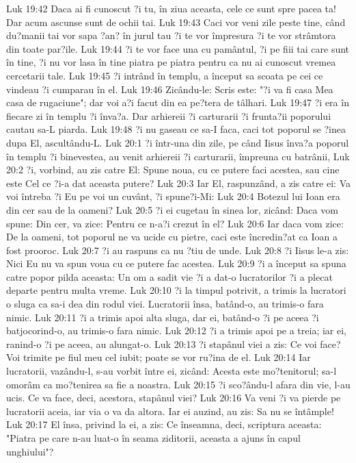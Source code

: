 Luk 19:42  Daca ai fi cunoscut ?i tu, în ziua aceasta, cele ce sunt spre pacea ta! Dar acum ascunse sunt de ochii tai.
Luk 19:43  Caci vor veni zile peste tine, când du?manii tai vor sapa ?an? în jurul tau ?i te vor împresura ?i te vor strâmtora din toate par?ile.
Luk 19:44  ?i te vor face una cu pamântul, ?i pe fiii tai care sunt în tine, ?i nu vor lasa în tine piatra pe piatra pentru ca nu ai cunoscut vremea cercetarii tale.
Luk 19:45  ?i intrând în templu, a început sa scoata pe cei ce vindeau ?i cumparau în el.
Luk 19:46  Zicându-le: Scris este: "?i va fi casa Mea casa de rugaciune"; dar voi a?i facut din ea pe?tera de tâlhari.
Luk 19:47  ?i era în fiecare zi în templu ?i înva?a. Dar arhiereii ?i carturarii ?i frunta?ii poporului cautau sa-L piarda.
Luk 19:48  ?i nu gaseau ce sa-I faca, caci tot poporul se ?inea dupa El, ascultându-L.
Luk 20:1  ?i într-una din zile, pe când Iisus înva?a poporul în templu ?i binevestea, au venit arhiereii ?i carturarii, împreuna cu batrânii,
Luk 20:2  ?i, vorbind, au zis catre El: Spune noua, cu ce putere faci acestea, sau cine este Cel ce ?i-a dat aceasta putere?
Luk 20:3  Iar El, raspunzând, a zis catre ei: Va voi întreba ?i Eu pe voi un cuvânt, ?i spune?i-Mi:
Luk 20:4  Botezul lui Ioan era din cer sau de la oameni?
Luk 20:5  ?i ei cugetau în sinea lor, zicând: Daca vom spune: Din cer, va zice: Pentru ce n-a?i crezut în el?
Luk 20:6  Iar daca vom zice: De la oameni, tot poporul ne va ucide cu pietre, caci este încredin?at ca Ioan a fost prooroc.
Luk 20:7  ?i au raspuns ca nu ?tiu de unde.
Luk 20:8  ?i Iisus le-a zis: Nici Eu nu va spun voua cu ce putere fac acestea.
Luk 20:9  ?i a început sa spuna catre popor pilda aceasta: Un om a sadit vie ?i a dat-o lucratorilor ?i a plecat departe pentru multa vreme.
Luk 20:10  ?i la timpul potrivit, a trimis la lucratori o sluga ca sa-i dea din rodul viei. Lucratorii însa, batând-o, au trimis-o fara nimic.
Luk 20:11  ?i a trimis apoi alta sluga, dar ei, batând-o ?i pe aceea ?i batjocorind-o, au trimis-o fara nimic.
Luk 20:12  ?i a trimis apoi pe a treia; iar ei, ranind-o ?i pe aceea, au alungat-o.
Luk 20:13  ?i stapânul viei a zis: Ce voi face? Voi trimite pe fiul meu cel iubit; poate se vor ru?ina de el.
Luk 20:14  Iar lucratorii, vazându-l, s-au vorbit între ei, zicând: Acesta este mo?tenitorul; sa-l omorâm ca mo?tenirea sa fie a noastra.
Luk 20:15  ?i sco?ându-l afara din vie, l-au ucis. Ce va face, deci, acestora, stapânul viei?
Luk 20:16  Va veni ?i va pierde pe lucratorii aceia, iar via o va da altora. Iar ei auzind, au zis: Sa nu se întâmple!
Luk 20:17  El însa, privind la ei, a zis: Ce înseamna, deci, scriptura aceasta: "Piatra pe care n-au luat-o în seama ziditorii, aceasta a ajuns în capul unghiului"?
